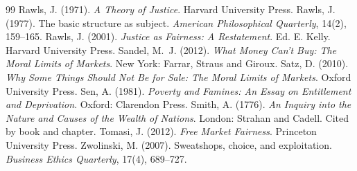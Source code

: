 \documentclass{situationist-preprint}
\begin{document}
\begin{thebibliography}{99}
 Rawls, J. (1971). \emph{A Theory of Justice}. Harvard University Press.
 Rawls, J. (1977). The basic structure as subject. \emph{American Philosophical Quarterly}, 14(2), 159--165.
 Rawls, J. (2001). \emph{Justice as Fairness: A Restatement}. Ed. E. Kelly. Harvard University Press.
 Sandel, M.~J. (2012). \emph{What Money Can't Buy: The Moral Limits of Markets}. New York: Farrar, Straus and Giroux.
 Satz, D. (2010). \emph{Why Some Things Should Not Be for Sale: The Moral Limits of Markets}. Oxford University Press.
 Sen, A. (1981). \emph{Poverty and Famines: An Essay on Entitlement and Deprivation}. Oxford: Clarendon Press.
 Smith, A. (1776). \emph{An Inquiry into the Nature and Causes of the Wealth of Nations}. London: Strahan and Cadell. Cited by book and chapter.
 Tomasi, J. (2012). \emph{Free Market Fairness}. Princeton University Press.
 Zwolinski, M. (2007). Sweatshops, choice, and exploitation. \emph{Business Ethics Quarterly}, 17(4), 689--727.
\end{thebibliography}
\end{document}

